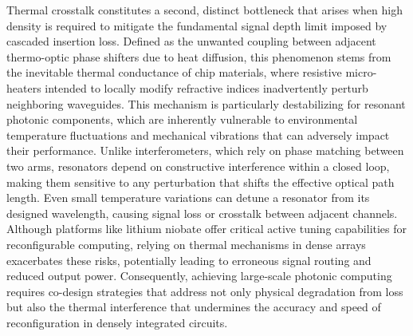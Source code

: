 \documentclass[11pt]{article}
\begin{document}
Thermal crosstalk constitutes a second, distinct bottleneck that arises when high density is required to mitigate the fundamental signal depth limit imposed by cascaded insertion loss. Defined as the unwanted coupling between adjacent thermo-optic phase shifters due to heat diffusion, this phenomenon stems from the inevitable thermal conductance of chip materials, where resistive micro-heaters intended to locally modify refractive indices inadvertently perturb neighboring waveguides. \citep{doi_10_1109_access_2020_3013116_8fec1fb2} This mechanism is particularly destabilizing for resonant photonic components, which are inherently vulnerable to environmental temperature fluctuations and mechanical vibrations that can adversely impact their performance. \citep{doi_10_3390_photonics13030300_610aff5a} \citep{doi_10_1117_12_3079802_9c364d8e} Unlike interferometers, which rely on phase matching between two arms, resonators depend on constructive interference within a closed loop, making them sensitive to any perturbation that shifts the effective optical path length. Even small temperature variations can detune a resonator from its designed wavelength, causing signal loss or crosstalk between adjacent channels. Although platforms like lithium niobate offer critical active tuning capabilities for reconfigurable computing, relying on thermal mechanisms in dense arrays exacerbates these risks, potentially leading to erroneous signal routing and reduced output power. Consequently, achieving large-scale photonic computing requires co-design strategies that address not only physical degradation from loss but also the thermal interference that undermines the accuracy and speed of reconfiguration in densely integrated circuits. \citep{doi_10_1109_access_2020_3013116_8fec1fb2} \citep{doi_10_3390_nano14080697_c372a140} \citep{doi_10_1126_science_abj4396_40f36a09}
\end{document}

